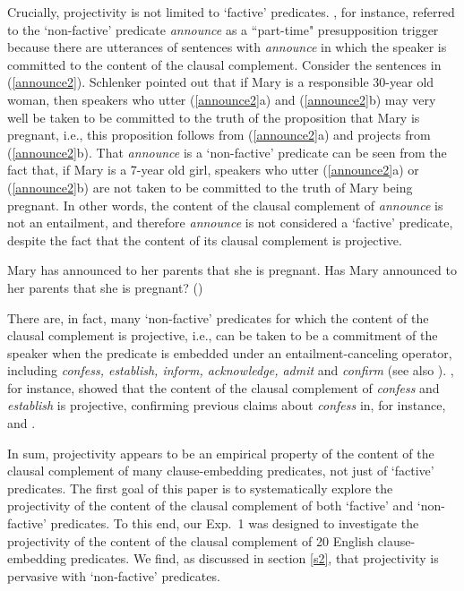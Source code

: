 \documentclass[11pt,fleqn]{article}
\newcommand{\6}{\mbox{$[\hspace*{-.6mm}[$}}
\newcommand{\9}{\mbox{$]\hspace*{-.6mm}]$}}
\begin{document}
Crucially, projectivity is not limited to `factive' predicates.  \citet[139]{schlenker10}, for instance, referred to the `non-factive' predicate {\em announce} as a ``part-time" presupposition trigger because there are utterances of sentences with {\em announce} in which the speaker is committed to the content of the clausal complement. Consider the sentences in (\ref{announce2}). Schlenker pointed out that if Mary is a responsible 30-year old woman, then speakers who utter (\ref{announce2}a) and (\ref{announce2}b) may very well be taken to be committed to the truth of the proposition that Mary is pregnant, i.e., this proposition follows from (\ref{announce2}a) and projects from (\ref{announce2}b). That  {\em announce} is a `non-factive' predicate can be seen from the fact that, if Mary is a 7-year old girl,  speakers who utter (\ref{announce2}a) or (\ref{announce2}b) are not taken to be committed to the truth of Mary being pregnant. In other words, the content of the clausal complement of {\em announce} is not an entailment, and therefore {\em announce} is not considered a `factive' predicate, despite the fact that the content of its clausal complement is projective.

\begin{exe}
\ex\label{announce2} 
\begin{xlist}
\ex Mary has announced to her parents that she is pregnant.
\ex Has Mary announced to her parents that she is pregnant? \hfill (\citealt[139]{schlenker10})
\end{xlist}
\end{exe}
There are, in fact, many `non-factive' predicates for which the content of the clausal complement is projective, i.e., can be taken to be a commitment of the speaker when the predicate is embedded under an entailment-canceling operator, including {\em confess, establish, inform, acknowledge, admit} and {\em confirm} (see also \citealt[\S2.2]{anand-hacquard2014}). \citet{tbd-variability}, for instance, showed that the content of the clausal complement of {\em confess} and {\em establish} is projective, confirming previous claims about {\em confess} in, for instance, \citealt{reis1973,melvold1991,schultz2003,swanson2012} and \citealt{karttunen2016}. 

In sum, projectivity appears to be an empirical property of the content of the clausal complement of many clause-embedding predicates, not just of `factive' predicates. The first goal of this paper is to systematically explore the projectivity of the content of the clausal complement of both `factive' and `non-factive' predicates. To this end, our Exp.~1 was designed to investigate the projectivity of the content of the clausal complement of 20 English clause-embedding predicates. We find, as discussed in section \ref{s2}, that projectivity is pervasive with `non-factive' predicates.
\end{document}
